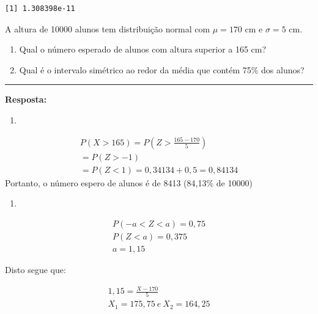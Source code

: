 \documentclass[
  letterpaper,
  DIV=11,
  numbers=noendperiod]{scrartcl}
\providecommand{\tightlist}{%
  \setlength{\itemsep}{0pt}\setlength{\parskip}{0pt}}
\begin{document}
\begin{verbatim}
[1] 1.308398e-11
\end{verbatim}

\begin{exemplo}

A altura de 10000 alunos tem distribuição normal com \(\mu=170\) cm e
\(\sigma=5\) cm.

\begin{enumerate}
\def\labelenumi{\alph{enumi})}
\item
  Qual o número esperado de alunos com altura superior a 165 cm?
\item
  Qual é o intervalo simétrico ao redor da média que contém 75\% dos
  alunos?
\end{enumerate}

\begin{center}\rule{0.5\linewidth}{0.5pt}\end{center}

\textbf{Resposta:}

\begin{enumerate}
\def\labelenumi{\alph{enumi})}
\tightlist
\item
\end{enumerate}

\[\begin{array}{ccc}
P(X>165)= P(Z>\frac{165-170}{5})
\\
= P(Z>-1)
\\
=P(Z<1) = 0,34134 + 0,5 = 0,84134
\end{array}\] Portanto, o número espero de alunos é de 8413 (84,13\% de
10000)

\begin{enumerate}
\def\labelenumi{\alph{enumi})}
\setcounter{enumi}{1}
\tightlist
\item
\end{enumerate}

\[\begin{array}{ccc}
P(-a<Z<a)=0,75
\\
P(Z<a)=0,375
\\
a=1,15
\end{array}\]

Disto segue que:

\[\begin{array}{ccc}
1,15= \frac{X-170}{5}
\\
X_1= 175,75 \ e \ X_2=164,25
\end{array}\]

\end{exemplo}
\end{document}
